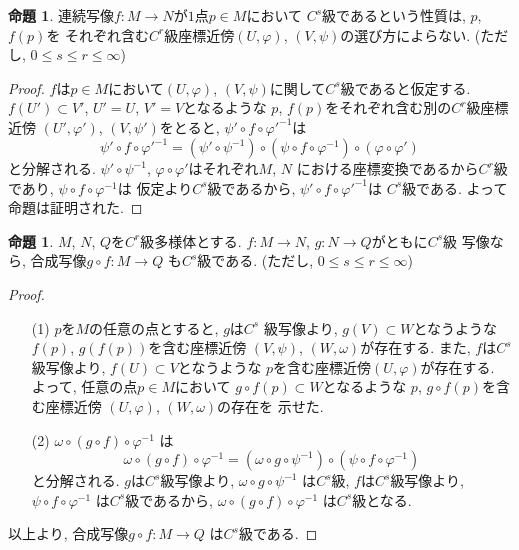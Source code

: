 \documentclass[a4j,12pt]{jarticle}
\theoremstyle{definition}
\newtheorem{proposition}[theorem]{命題}
\begin{document}
\begin{proposition}
    連続写像$f:M\to N$が$1$点$p\in M$において
    $C^s$級であるという性質は, $p$, $f(p)$を
    それぞれ含む$C^r$級座標近傍$(U,\varphi)$, 
    $(V, \psi)$の選び方によらない. 
    (ただし, $0\leq s \leq r \leq \infty$)
\end{proposition}
\begin{proof}
    $f$は$p\in M$において$(U,\varphi)$, 
    $(V, \psi)$に関して$C^s$級であると仮定する. 
    $f(U')\subset V'$, $U'=U$, $V'=V$となるような
    $p$, $f(p)$をそれぞれ含む別の$C^r$級座標近傍
    $(U',\varphi')$, $(V, \psi')$をとると, 
    $\psi'\circ f\circ \varphi'^{-1}$は
    $$\psi'\circ f\circ \varphi'^{-1}=
    (\psi'\circ \psi^{-1})\circ
    (\psi \circ f\circ \varphi^{-1})\circ
    (\varphi \circ \varphi')$$
    と分解される. $\psi'\circ \psi^{-1}$, 
    $\varphi \circ \varphi'$はそれぞれ$M$, $N$
    における座標変換であるから$C^r$級であり, 
    $\psi \circ f\circ \varphi^{-1}$は
    仮定より$C^s$級であるから, 
    $\psi'\circ f\circ \varphi'^{-1}$は
    $C^s$級である. よって命題は証明された. 
\end{proof}
\begin{proposition}
    $M$, $N$, $Q$を$C^r$級多様体とする. 
    $f:M\to N$, $g:N\to Q$がともに$C^s$級
    写像なら, 合成写像$g\circ f:M\to Q$
    も$C^s$級である. 
    (ただし, $0\leq s \leq r \leq \infty$)
\end{proposition}
\begin{proof}
    \begin{itemize}
        \item[(1)]
        $p$を$M$の任意の点とすると, $g$は$C^s$
        級写像より, $g(V)\subset W$となうような
        $f(p)$, $g(f(p))$を含む座標近傍
        $(V,\psi)$, $(W, \omega)$が存在する. 
        また, $f$は$C^s$
        級写像より, $f(U)\subset V$となうような
        $p$を含む座標近傍$(U,\varphi)$が存在する. 
        よって, 任意の点$p\in M$において
        $g\circ f(p)\subset W$となるような
        $p$, $g\circ f(p)$を含む座標近傍
        $(U,\varphi)$, $(W, \omega)$の存在を
        示せた. 
        \item[(2)] 
        $\omega \circ (g\circ f)\circ \varphi^{-1}$
        は
        $$\omega \circ (g\circ f)\circ \varphi^{-1}
        =(\omega \circ g\circ \psi^{-1})\circ
        (\psi \circ f\circ \varphi^{-1})$$
        と分解される. 
        $g$は$C^s$級写像より, 
        $\omega \circ g\circ \psi^{-1}$
        は$C^s$級, 
        $f$は$C^s$級写像より,
        $\psi \circ f\circ \varphi^{-1}$
        は$C^s$級であるから, 
        $\omega \circ (g\circ f)\circ \varphi^{-1}$
        は$C^s$級となる. 
    \end{itemize}
    以上より, 合成写像$g\circ f:M\to Q$
    は$C^s$級である.
\end{proof}
\end{document}
